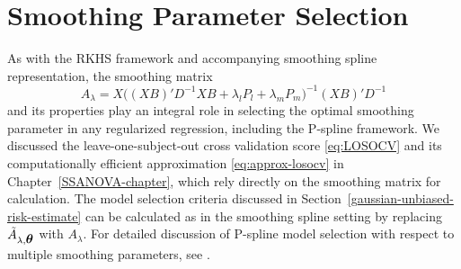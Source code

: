 

\section{Smoothing Parameter Selection}

%
As with the RKHS framework and accompanying smoothing spline representation, the smoothing matrix  
\begin{equation*}\label{eq:pspline-smoothing-matrix}
A_\lambda = X \big( \left(X B\right)' D^{-1} XB +  \lambda_l P_l+ \lambda_m P_m \big)^{-1}\left(X B\right)' D^{-1}
\end{equation*}
\noindent
and its properties play an integral role in selecting the optimal smoothing parameter in any regularized regression, including the P-spline framework. We discussed the leave-one-subject-out cross validation score \eqref{eq:LOSOCV} and its computationally efficient approximation \eqref{eq:approx-losocv} in Chapter~\ref{SSANOVA-chapter}, which rely directly on the smoothing matrix for calculation. The model selection criteria discussed in Section~\ref{gaussian-unbiased-risk-estimate}  can be calculated as in the smoothing spline setting by replacing $\tilde{A}_{\lambda,\mbox{\boldmath $\theta$}}$ with $A_\lambda$. For detailed discussion of P-spline model selection with respect to multiple smoothing parameters, see \cite{wood2017generalized}.

\bigskip

